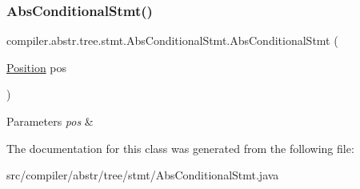 \subsubsection{\texorpdfstring{Abs\+Conditional\+Stmt()}{AbsConditionalStmt()}}
{\footnotesize\ttfamily compiler.\+abstr.\+tree.\+stmt.\+Abs\+Conditional\+Stmt.\+Abs\+Conditional\+Stmt (\begin{DoxyParamCaption}\item[{\hyperlink{classcompiler_1_1_position}{Position}}]{pos }\end{DoxyParamCaption})}


\begin{DoxyParams}{Parameters}
{\em pos} & \\
\hline
\end{DoxyParams}


The documentation for this class was generated from the following file\+:\begin{DoxyCompactItemize}
\item 
src/compiler/abstr/tree/stmt/Abs\+Conditional\+Stmt.\+java\end{DoxyCompactItemize}
